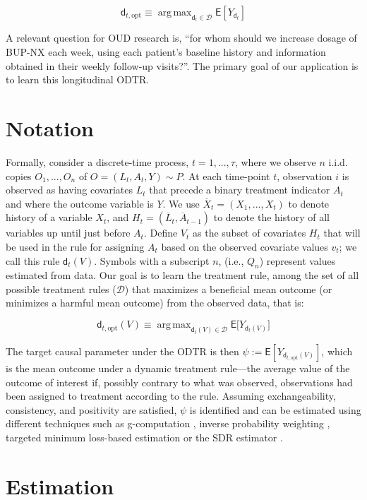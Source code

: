 \documentclass[11pt]{article}
\DeclareMathOperator*{\argmax}{arg\,max}
\renewcommand{\d}{\mathsf{d}}
\newcommand{\E}{\mathsf{E}}
\begin{document}
	$$
	\d_{t,\text{opt}} \equiv \argmax_{\d_t \in \mathcal{D}} \E [Y_{\d_t}]
	$$
	
	A relevant question for OUD research is, ``for whom should we increase dosage of BUP-NX each week, using each patient's baseline history and information obtained in their weekly follow-up visits?''. The primary goal of our application is to learn this longitudinal ODTR.
	
	\section{Notation}

	Formally, consider a discrete-time process, $t = 1, ..., \tau$, where we observe $n$ i.i.d. copies $O_1, ..., O_n$ of $O = (L_t, A_t, Y) \sim P$. At each time-point $t$, observation $i$ is observed as having covariates $L_t$ that precede a binary treatment indicator $A_t$ and where the outcome variable is $Y$. We use $\overline{X}_t = (X_1, ..., X_t)$ to denote history of a variable $X_t$, and $H_t = (\overline{L}_t, \overline{A}_{t-1})$ to denote the history of all variables up until just before $A_t$. Define $V_t$ as the subset of covariates $H_t$ that will be used in the rule for assigning $A_t$ based on the observed covariate values $v_t$; we call this rule $\d_t(V)$. Symbols with a subscript $n$, (i.e., $Q_n$) represent values estimated from data. Our goal is to learn the treatment rule, among the set of all possible treatment rules ($\mathcal{D}$) that maximizes a beneficial mean outcome (or minimizes a harmful mean outcome) from the observed data, that is: 

	$$
	\d_{t, \text{opt}}(V) \equiv \argmax _{\d_t(V) \in \mathcal{D}} \E \Big[ Y_{\d_t(V)} \Big]
	$$

	The target causal parameter under the ODTR is then $\psi := \E[Y_{\d_{t, \text{opt}}(V)}]$, which is the mean outcome under a dynamic treatment rule---the average value of the outcome of interest if, possibly contrary to what was observed, observations had been assigned to treatment according to the rule. Assuming exchangeability, consistency, and positivity are satisfied, $\psi$ is identified and can be estimated using different techniques such as g-computation \citep{}, inverse probability weighting \citep{}, targeted minimum loss-based estimation \citep{tmleLong} or the SDR estimator \cite{luedtke2018sequential}.

\section{Estimation} 
\end{document}

